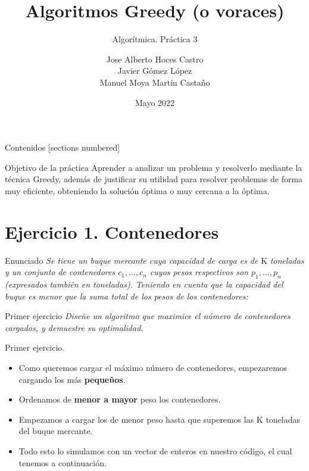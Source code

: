 \documentclass[10pt, xcolor=table]{beamer}
\title{Algoritmos Greedy (o voraces)}
\subtitle{Algorítmica. \alert{Práctica 3}}
\date{Mayo 2022}
\author{Jose Alberto Hoces Castro\\Javier Gómez López\\ Manuel Moya Martín Castaño\\[4pt]}
\begin{document}
\maketitle

\begin{frame}{Contenidos}
	[sections numbered]
	\tableofcontents[]
\end{frame}

\begin{frame}[fragile]{Objetivo de la práctica}
	Aprender a analizar un problema y resolverlo mediante la técnica Greedy, además de justificar su utilidad para resolver problemas de forma muy eficiente, obteniendo la solución óptima o muy cercana a la óptima.
\end{frame}

\section{Ejercicio 1. Contenedores}
\begin{frame}[fragile]{Enunciado}
	\textit{Se tiene un buque mercante cuya capacidad de carga es de } K \textit{toneladas y un conjunto de contenedores \(c_1, \dotsc, c_n\) cuyos pesos respectivos son \(p_1, \dotsc, p_n\) (expresados también en toneladas). Teniendo en cuenta que la capacidad del buque es menor que la suma total de los pesos de los contenedores: }
\end{frame}

\begin{frame}[fragile]{Primer ejercicio}
	\textit{Diseñe un algoritmo que maximice el número de contenedores cargados, y demuestre su optimalidad.}
\end{frame}

\begin{frame}[fragile]{Primer ejercicio. }
	\begin{itemize}
		\item Como queremos cargar el máximo número de contenedores, empezaremos cargando los más \textbf{pequeños}.
		\item Ordenamos de \textbf{menor a mayor} peso los contenedores.
		\item Empezamos a cargar los de menor peso hasta que superemos las K toneladas del buque mercante.
		\item Todo esto lo simulamos con un vector de enteros en nuestro código, el cual tenemos a continuación.
	\end{itemize}
\end{frame}
\end{document}
